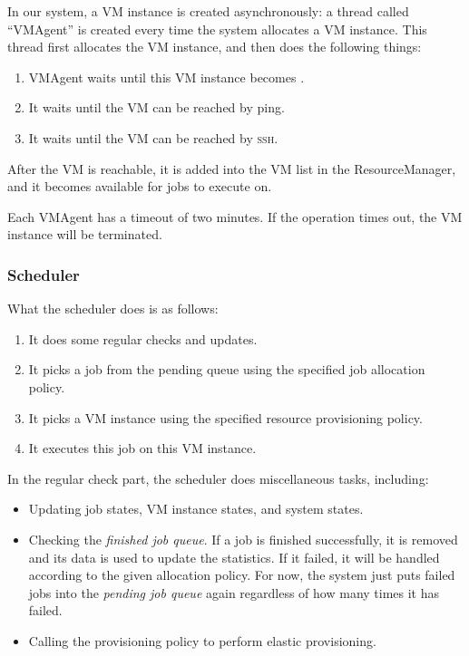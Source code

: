 In our system, a VM instance is created asynchronously: a
thread called ``VMAgent'' is created every time the system allocates a
VM instance. This thread first allocates the VM instance, and then
does the following things:

\begin{enumerate}
\item VMAgent waits until this VM instance becomes \staterunning.
\item It waits until the VM can be reached by ping.
\item It waits until the VM can be reached by \textsc{ssh}.
\end{enumerate}

After the VM is reachable, it is added into the VM list in the
ResourceManager, and it becomes available for jobs to execute on.

Each VMAgent has a timeout of two minutes. If the operation times out,
the VM instance will be terminated.

\subsubsection{Scheduler}
What the scheduler does is as follows:

\begin{enumerate}
\item It does some regular checks and updates.
\item It picks a job from the pending queue using the specified job
  allocation policy.
\item It picks a VM instance using the specified resource provisioning
  policy.
\item It executes this job on this VM instance.
\end{enumerate}

In the regular check part, the scheduler does miscellaneous tasks,
including:
\begin{itemize}
\item Updating job states, VM instance states, and system states.
\item Checking the \emph{finished job queue}. If a job is finished
  successfully, it is removed and its data is used to update the
  statistics. If it failed, it will be handled according to the given
  allocation policy. For now, the system just puts failed jobs into
  the \emph{pending job queue} again regardless of how many times it
  has failed.
\item Calling the provisioning policy to perform elastic provisioning.
\end{itemize}

